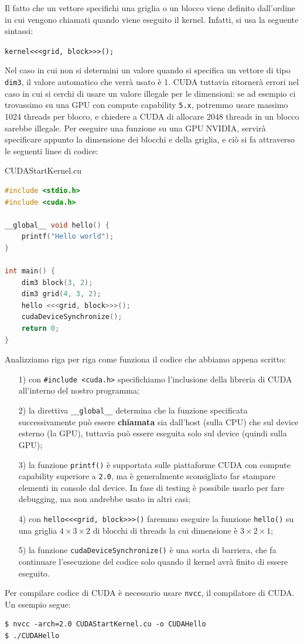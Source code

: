 Il fatto che un vettore specifichi una griglia o un blocco viene definito dall'ordine in cui vengono chiamati quando viene eseguito il kernel. Infatti, si usa la seguente sintassi:

\begin{center}
    \verb|kernel<<<grid, block>>>();|
\end{center}

Nel caso in cui non si determini un valore quando si specifica un vettore di tipo \verb|dim3|, il valore automatico che verrà usato è 1. CUDA tuttavia ritornerà errori nel caso in cui si cerchi di usare un valore illegale per le dimensioni: se ad esempio ci trovassimo su una GPU con compute capability \verb|5.x|, potremmo usare massimo 1024 threads per blocco, e chiedere a CUDA di allocare 2048 threads in un blocco sarebbe illegale.
\nl
Per eseguire una funzione su una GPU NVIDIA, servirà specificare appunto la dimensione dei blocchi e della griglia, e ciò si fa attraverso le seguenti linee di codice:

\begin{codeblock}{CUDAStartKernel.cu}
    \begin{lstlisting}[language = C]
#include <stdio.h>
#include <cuda.h>

__global__ void hello() {
    printf("Hello world");
}

int main() {
    dim3 block(3, 2);
    dim3 grid(4, 3, 2);
    hello <<<grid, block>>>();
    cudaDeviceSynchronize();
    return 0;
}\end{lstlisting}
\end{codeblock}

Analizziamo riga per riga come funziona il codice che abbiamo appena scritto:
\begin{itemize}
    \item [1)] con \verb|#include <cuda.h>| specifichiamo l'inclusione della libreria di CUDA all'interno del nostro programma;
    \item [2)] la direttiva \verb|__global__| determina che la funzione specificata successivamente può essere \textbf{chiamata} sia dall'host (sulla CPU) che sul device esterno (la GPU), tuttavia può essere eseguita solo sul device (quindi sulla GPU);
    \item [3)] la funzione \verb|printf()| è supportata sulle piattaforme CUDA con compute capability superiore a \verb|2.0|, ma è generalmente sconsigliato far stampare elementi in console dal device. In fase di testing è possibile usarlo per fare debugging, ma non andrebbe usato in altri casi;
    \item [4)] con \verb|hello<<<grid, block>>>()| faremmo eseguire la funzione \verb|hello()| su una griglia $4 \times 3 \times 2$ di blocchi di threads la cui dimensione è $3 \times 2 \times 1$;
    \item [5)] la funzione \verb|cudaDeviceSynchronize()| è una sorta di barriera, che fa continuare l'esecuzione del codice solo quando il kernel avrà finito di essere eseguito.
\end{itemize}

Per compilare codice di CUDA è necessario usare \verb|nvcc|, il compilatore di CUDA. Un esempio segue:

\begin{terminal}
    \begin{lstlisting}[style = notexterm]
$ nvcc -arch=2.0 CUDAStartKernel.cu -o CUDAHello
$ ./CUDAHello\end{lstlisting}
\end{terminal}